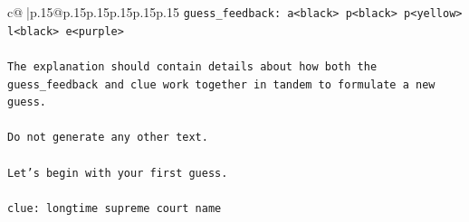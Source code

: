 \documentclass{article}
\begin{document}
{\begin{supertabular}{c@{$\;$}|p{.15\linewidth}@{}p{.15\linewidth}p{.15\linewidth}p{.15\linewidth}p{.15\linewidth}p{.15\linewidth}}
{{{\texttt{guess\_feedback: a<black> p<black> p<yellow> l<black> e<purple>} \\
\\ 
\texttt{The explanation should contain details about how both the guess\_feedback and clue work together in tandem to formulate a new guess.} \\
\\ 
\texttt{Do not generate any other text.} \\
\\ 
\texttt{Let's begin with your first guess.} \\
\\ 
\texttt{clue: longtime supreme court name} \\
            }
        }
    }
     \\ \\


\end{supertabular}}
\end{document}
